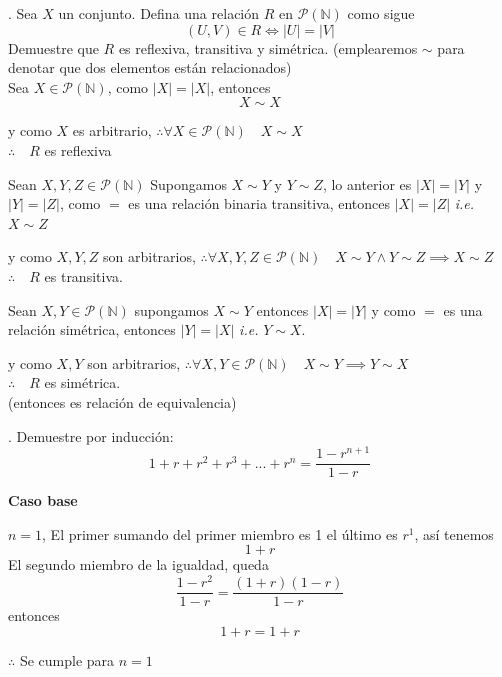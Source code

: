 \documentclass[letterpaper]{article}
\providecommand{\abs}[1]{\left|#1\right|}
\newcommand{\N}{\mathds{N}}
\renewcommand{\P}{\mathcal{P}}
\renewcommand{\*}{\cdot}
\theoremstyle{definition}
\begin{document}
. Sea $ X $ un conjunto. Defina una relación $ R $ en $ \P(\N) $ como sigue
\[ (U,V) \in R \iff \abs{U} = \abs{V} \]
Demuestre que $ R $ es reflexiva, transitiva y simétrica. (emplearemos $ \sim $ para denotar que dos elementos están relacionados)\\
Sea $ X \in \P(\N)$, como $ \abs{X} = \abs{X} $, entonces
\[ X \sim X  \]
\begin{center}
	y como $ X $ es arbitrario, $\therefore \forall X \in \P(\N) \quad X \sim X  $\\
	$ \therefore \quad R $ es reflexiva
\end{center}
Sean $ X, Y, Z \in \P(\N) $
Supongamos $ X \sim Y $ y $ Y \sim Z $, lo anterior es $ \abs{X} = \abs{Y} $ y $ \abs{Y} = \abs{Z} $, como $ = $ es una relación binaria transitiva, entonces $ \abs{X} = \abs{Z} $ \textit{i.e. } $ X \sim Z $ 
\begin{center}
	y como $ X,Y, Z $ son arbitrarios, $\therefore \forall X, Y,Z \in \P(\N) \quad X \sim Y \land Y \sim  Z \implies X \sim Z  $\\
	$ \therefore \quad R $ es transitiva.
\end{center}
Sean $ X,Y \in \P(\N)$
supongamos $ X \sim Y $ entonces $ \abs{X} = \abs{Y} $ y como $ = $ es una relación simétrica, entonces $ \abs{Y} = \abs{X} $ \textit{i.e. }
$ Y \sim X $.
\begin{center}
	y como $ X,Y $ son arbitrarios, $\therefore \forall X, Y \in \P(\N) \quad X \sim Y  \implies Y \sim X  $\\
	$ \therefore \quad R $ es simétrica.\\
	(entonces es relación de equivalencia)
\end{center}
. Demuestre por inducción:
$$1+r+r^2+r^3+...+r^n=\frac{1-r^{n+1}}{1-r}$$
\begin{flushright}
	\textbf{Caso base} 
\end{flushright}
$ n=1 $, El primer sumando del primer miembro es 1 el último es $r^1$, así tenemos\\
$$1+r$$ 
El segundo miembro de la igualdad, queda $$\frac{1-r^2}{1-r}=\frac{(1+r)(1-r)}{1-r}$$
entonces $$1+r=1+r$$ 
\begin{center}
	$ \therefore $  Se cumple para $n=1$
\end{center}
\end{document}
